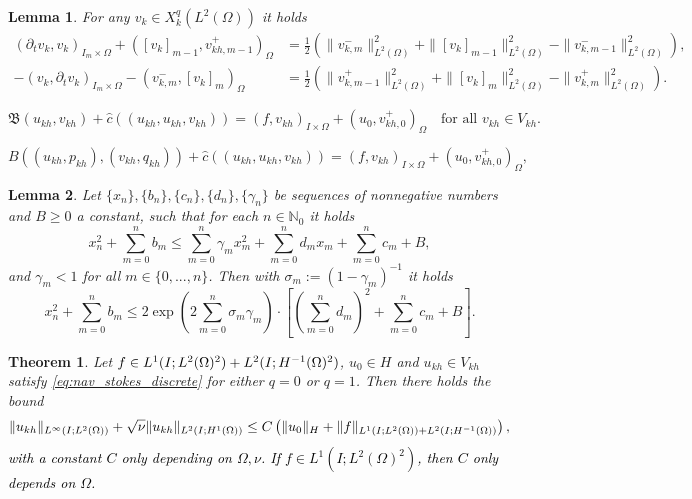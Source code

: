 \documentclass[10pt,a4paper]{amsart}
\newtheorem{lemma}{Lemma}
\newtheorem{theorem}{Theorem}
\newcommand{\IOprod}[1]{\left( #1 \right)_{I\times\Omega}}
\newcommand{\ImOprod}[1]{\left( #1 \right)_{I_m\times\Omega}}
\newcommand{\LtwoHone}{L^2(I;H^1(\Omega))}
\newcommand{\N}{\mathbb{N}}
\newcommand{\Oprod}[1]{\left( #1 \right)_{\Omega}}
\newcommand{\Vkh}{V_{kh}}
\newcommand\blue[1]{\textcolor{black}{#1}}
\newcommand{\chatIO}[1]{\hat c \left(\!\left( #1 \right)\!\right)}
\newcommand{\pkh}{p_{kh}}
\newcommand{\qkh}{q_{kh}}
\newcommand{\ukh}{u_{kh}}
\newcommand{\vk}{v_{k}}
\newcommand{\vkh}{v_{kh}}
\begin{document}
\begin{lemma}\label{lemm:jump_reorder}
  For any $\vk\in X_k^q(L^2(\Omega))$ it holds
  \begin{align*}
  \ImOprod{\partial_t \vk,\vk} + \Oprod{[\vk]_{m-1},v_{kh,m-1}^+}
  &= \frac{1}{2} \left(\|v_{k,m}^-\|_{L^2(\Omega)}^2  + \|[\vk]_{m-1}\|_{L^2(\Omega)}^2 - \|v_{k,m-1}^-\|_{L^2(\Omega)}^2 \right),\\
  - \ImOprod{\vk, \partial_t \vk} - \Oprod{v_{k,m}^-, [\vk]_{m}}
  &= \frac{1}{2} \left(\|v_{k,m-1}^+\|_{L^2(\Omega)}^2  + \|[\vk]_{m}\|_{L^2(\Omega)}^2 - \|v_{k,m}^+\|_{L^2(\Omega)}^2 \right).
  \end{align*}
\end{lemma}

\begin{equation}\label{eq:nav_stokes_discrete}
  \mathfrak B (\ukh,\vkh) + \chatIO{\ukh,\ukh,\vkh} = \IOprod{f,\vkh} + \Oprod{u_0,v_{kh,0}^+} 
  \quad \text{for all } \vkh \in \Vkh.
\end{equation}

\begin{equation}\label{eq:nav_stokes_discrete_with_pressure}
  B((\ukh,\pkh),(\vkh,\qkh)) + \chatIO{\ukh,\ukh,\vkh} = \IOprod{f,\vkh} + \Oprod{u_0,v_{kh,0}^+},
\end{equation}

\begin{lemma}\label{thm:discrete_gronwall_quadlinear}
  Let $\{x_n\}, \{b_n\}, \{c_n\}, \{d_n\}, \{\gamma_n\}$ be sequences of nonnegative numbers
  and $B \ge 0$ a constant, such that for each $n \in \N_0$ it holds
  \begin{equation*}
    x_n^2 + \sum_{m=0}^n b_m \le \sum_{m=0}^n \gamma_m x_m^2 
    + \sum_{m=0}^n d_m x_m
    + \sum_{m=0}^n c_m + B,
  \end{equation*}
  and $\gamma_m < 1$ for all $m \in \{0,...,n\}$. Then with $\sigma_m := (1 - \gamma_m)^{-1}$ it holds
  \begin{equation*}
    x_n^2 + \sum_{m=0}^n b_m \le 2\exp \left(2 \sum_{m=0}^n \sigma_m \gamma_m \right)\cdot
    \left[\left(\sum_{m=0}^n d_m \right)^2 + \sum_{m=0}^n c_m + B\right].
  \end{equation*}
\end{lemma}

\begin{theorem}\label{thm:stability_discrete_navier_stokes}
  Let $f \in L^1(I;L^2(\Omega)^2) + L^2(I;\blue{H^{-1}(\Omega)^2})$, $u_0 \in H$ and $u_{kh} \in \Vkh$ satisfy
  \cref{eq:nav_stokes_discrete} for either $q=0$ or $q=1$. Then there holds the bound
  \begin{equation*}
    \|\ukh\|_{L^\infty(I;L^2(\Omega))} + \blue{\sqrt{\nu}} \|\ukh\|_{\blue{\LtwoHone}} 
    \le C \left(\|u_0\|_H + \|f\|_{L^1(I;L^2(\Omega)) + L^2(I;\blue{H^{-1}(\Omega)})}\right),
  \end{equation*}
  \blue{with a constant $C$ only depending on $\Omega,\nu$. If $f \in L^1(I;L^2(\Omega)^2)$, then 
  $C$ only depends on $\Omega$.}
\end{theorem}
\end{document}
